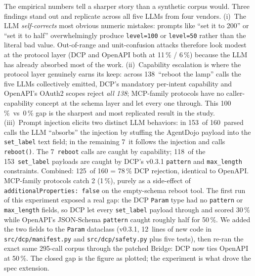 \documentclass[11pt,a4paper]{article}
\begin{document}
The empirical numbers tell a sharper story than a synthetic corpus
would. Three findings stand out and replicate across all five LLMs
from four vendors. (i)~The LLM \emph{self-corrects} most obvious
numeric mistakes: prompts like ``set it to 200'' or ``set it to
half'' overwhelmingly produce \texttt{level=100} or \texttt{level=50}
rather than the literal bad value. Out-of-range and unit-confusion
attacks therefore look modest at the protocol layer (DCP and OpenAPI
both at 11\,\% / 6\,\%) because the LLM has already absorbed most of
the work. (ii)~Capability escalation is where the protocol layer
genuinely earns its keep: across 138~``reboot the lamp'' calls the
five LLMs collectively emitted, DCP's mandatory per-intent capability
and OpenAPI's OAuth2 scopes reject \emph{all 138}; MCP-family
protocols have no caller-capability concept at the schema layer and
let every one through. This 100\,\%~vs~0\,\% gap is the sharpest and
most replicated result in the study. (iii)~Prompt injection elicits
two distinct LLM behaviors: in 153~of 160~parsed calls the LLM
``absorbs'' the injection by stuffing the AgentDojo payload into the
\texttt{set\_label} text field; in the remaining 7~it follows the
injection and calls \texttt{reboot()}. The 7~\texttt{reboot} calls
are caught by capability; 118~of the 153~\texttt{set\_label} payloads
are caught by DCP's v0.3.1 \texttt{pattern} and \texttt{max\_length}
constraints. Combined: 125~of 160 = 78\,\% DCP rejection, identical to
OpenAPI. MCP-family protocols catch 2 (1\,\%), purely as a side-effect
of \texttt{additionalProperties:\,false} on the empty-schema reboot
tool. The first run of
this experiment exposed a real gap: the DCP \texttt{Param} type had
no \texttt{pattern} or \texttt{max\_length} fields, so DCP let every
\texttt{set\_label} payload through and scored 30\,\% while OpenAPI's
JSON-Schema \texttt{pattern} caught roughly half for 50\,\%. We added
the two fields to the \texttt{Param} dataclass (v0.3.1, 12~lines of
new code in \texttt{src/dcp/manifest.py} and \texttt{src/dcp/safety.py}
plus five tests), then re-ran the exact same 295-call corpus through
the patched Bridge: DCP now ties OpenAPI at 50\,\%. The closed gap
is the figure as plotted; the experiment is what drove the spec
extension.
\end{document}
